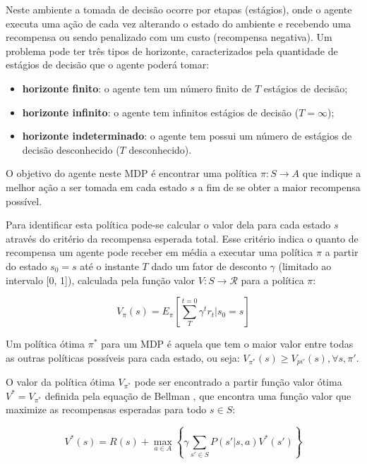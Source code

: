 \documentclass[letterpaper]{article}
\begin{document}
Neste ambiente a tomada de decisão ocorre por etapas (estágios), onde o agente executa uma ação de cada vez alterando o estado do ambiente e recebendo uma recompensa ou sendo penalizado com um custo (recompensa negativa). Um problema pode ter três tipos de horizonte, caracterizados pela quantidade de estágios de decisão que o agente poderá tomar:

\begin{itemize}
    \item \textbf{horizonte finito}: o agente tem um número finito de $T$ estágios de decisão;
    \item \textbf{horizonte infinito}: o agente tem infinitos estágios de decisão ($T = \infty$);
    \item \textbf{horizonte indeterminado}: o agente tem possui um número de estágios de decisão desconhecido ($T$ desconhecido).
\end{itemize}

O objetivo do agente neste MDP é encontrar uma política $\pi : S \rightarrow A$ que indique a melhor ação a ser tomada em cada estado $s$ a fim de se obter a maior recompensa possível.

Para identificar esta política pode-se calcular o valor dela para cada estado $s$ através do critério da recompensa esperada total. Esse critério indica o quanto de recompensa um agente pode receber em média a executar uma política $\pi$ a partir do estado $s_0 = s$ até o instante $T$ dado um fator de desconto $\gamma$ (limitado ao intervalo [0, 1]), calculada pela função valor $V : S \rightarrow \mathcal{R} $ para a política $\pi$:

\begin{equation} \label{eq:total_expected_reward}
    V_\pi(s) = E_\pi \left[ \sum_{T}^{t=0} \gamma^t r_t | s_0 = s \right]
\end{equation}

Um política ótima $\pi^*$ para um MDP é aquela que tem o maior valor entre todas as outras políticas possíveis para cada estado, ou seja: $V_{\pi^*}(s) \geq V_{pi'}(s), \forall s,\pi'$.

O valor da política ótima $V_{\pi^*}$ pode ser encontrado a partir função valor ótima $V^* = V_{\pi^*}$ definida pela equação de Bellman \cite{Bellman-1966}, que encontra uma função valor que maximize as recompensas esperadas para todo $s \in S$:

\begin{equation} \label{eq:bellman_equation}
    V^*(s) = R(s) + \max_{a \in A} \left\{ \gamma \sum_{s'\in S} P(s'|s,a)V^*(s') \right\}
\end{equation}
\end{document}

